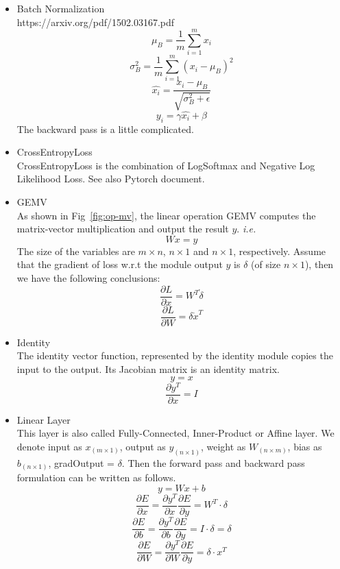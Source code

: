 \begin{itemize}

  \item Batch Normalization\\
	  https://arxiv.org/pdf/1502.03167.pdf
	  $$\mu_B = \frac{1}{m}\sum_{i=1}^m x_i$$
		 $$\sigma_B^2 = \frac{1}{m}\sum_{i=1}^m(x_i-\mu_B)^2$$
		 $$\hat{x_i} = \frac{x_i - \mu_B}{\sqrt{\sigma_B^2+\epsilon}}$$
		 $$y_i = \gamma\hat{x_i} + \beta$$
		 The backward pass is a little complicated.

 \item CrossEntropyLoss\\
	 CrossEntropyLoss is the combination of LogSoftmax and Negative Log
	 Likelihood Loss. See also Pytorch document.

 \item GEMV\\
	As shown in Fig~\ref{fig:op-mv}, the linear operation GEMV computes
	the matrix-vector multiplication and output the result $y$. {\it i.e.}
	$$ Wx = y $$
    The size of the variables are $m\times n$, $n\times 1$ and $n\times 1$,
	respectively. Assume that the gradient of loss w.r.t the module output $y$
	is $\delta$ (of size $n\times 1$), then we have the following conclusions:
		 $$ \frac{\partial L}{\partial x} = W^T \dot \delta $$
		 $$ \frac{\partial L}{\partial W} = \delta \dot x^T $$

 \item Identity\\
	 The identity vector function, represented by the identity module
	 copies the input to the output. Its Jacobian matrix is an identity
	 matrix.
	 $$ y = x $$
	 $$ \frac{\partial y^T}{\partial x} = I $$

 \item Linear Layer\\
	  This layer is also called Fully-Connected, Inner-Product or Affine
		layer. We denote input as $x_{(m\times 1)}$, output as
		 $y_{(n\times 1)}$, weight as $W_{(n\times m)}$,
		 bias as $b_{(n\times 1)}$, gradOutput = $\delta$.
		 Then the forward pass and backward pass formulation can
		 be written as follows.
		$$y = Wx + b$$
		 $$\frac{\partial E}{\partial x} = \frac{\partial y^T}{\partial x}
		 \frac{\partial E}{\partial y} = W^T \cdot \delta$$
		 $$\frac{\partial E}{\partial b} = \frac{\partial y^T}{\partial b}
		 \frac{\partial E}{\partial y} = I \cdot \delta = \delta$$
		 $$\frac{\partial E}{\partial W} = \frac{\partial y^T}{\partial W}
		 \frac{\partial E}{\partial y} = \delta \cdot x^T$$


\end{itemize}
